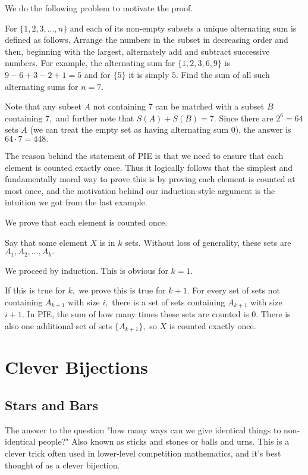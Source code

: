 \documentclass[blue,onecol]{shooting}
\begin{document}
We do the following problem to motivate the proof.

\begin{exam}[AIME 1983/13]
For $\{1, 2, 3, \ldots, n\}$ and each of its non-empty subsets a unique alternating sum is defined as follows. Arrange the numbers in the subset in decreasing order and then, beginning with the largest, alternately add and subtract successive numbers. For example, the alternating sum for $\{1, 2, 3, 6,9\}$ is $9-6+3-2+1=5$ and for $\{5\}$ it is simply $5$. Find the sum of all such alternating sums for $n=7$. 
\end{exam}

\begin{sol}
Note that any subset $A$ not containing $7$ can be matched with a subset $B$ containing $7,$ and further note that $S(A)+S(B)=7.$ Since there are $2^6=64$ sets $A$ (we can treat the empty set as having alternating sum $0$), the answer is $64\cdot 7=448.$
\end{sol}

The reason behind the statement of PIE is that we need to ensure that each element is counted exactly once. Thus it logically follows that the simplest and fundamentally moral way to prove this is by proving each element is counted at most once, and the motivation behind our induction-style argument is the intuition we got from the last example.

\begin{pro}
We prove that each element is counted once.

Say that some element $X$ is in $k$ sets. Without loss of generality, these sets are $A_1,A_2,\dots,A_k.$

We proceed by induction. This is obvious for $k=1.$

If this is true for $k,$ we prove this is true for $k+1.$ For every set of sets not containing $A_{k+1}$ with size $i,$ there is a set of sets containing $A_{k+1}$ with size $i+1.$ In PIE, the sum of how many times these sets are counted is $0.$ There is also one additional set of sets $\{A_{k+1}\},$ so $X$ is counted exactly once.
\end{pro}


\section{Clever Bijections}

\subsection{Stars and Bars}
The answer to the question "how many ways can we give identical things to non-identical people?" Also known as sticks and stones or balls and urns. This is a clever trick often used in lower-level competition mathematics, and it's best thought of as a clever bijection.
\end{document}
